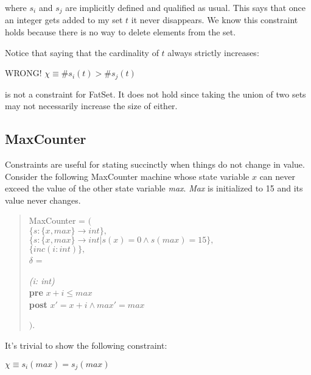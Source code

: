 \noindent where $s_i$ and $s_j$ are implicitly defined and qualified
as usual.  This says that once an integer gets added to my set $t$ it never
disappears.  We know this constraint holds because there is no way
to delete elements from the set.

Notice that saying that the cardinality of $t$ always
strictly increases:

\begin{center}
WRONG! $\chi \equiv \#s_i(t) > \#s_j(t)$
\end{center}

\noindent is not a constraint for FatSet.
It does not hold since taking the union of two sets
may not necessarily increase the size of either.

\subsection{MaxCounter}

Constraints are useful for stating succinctly when things
do not change in value.
Consider the following MaxCounter machine whose state variable $x$
can never exceed the value of the other state variable {\em max}.
{\em Max} is initialized to 15 and
its value never changes.

\begin{verse}
MaxCounter = $($ \\
$\{ s: \{x, max\} \rightarrow int  \},$ \\
$\{ s: \{x, max\} \rightarrow int | s(x) = 0 \wedge s(max) = 15 \},$ \\
$\{ inc(i: int) \},$ \\
$\delta$ = \\

\begin{spec}
\begin{tabbing}
\={\em (i: int)}\\
           \> {\bf pre} $ x + i \leq max$\\
           \> {\bf post} $x' = x + i \wedge max' = max$
\end{tabbing}
\end{spec}

$)$.
\end{verse}

It's trivial to show the following constraint:

\begin{center}
$\chi \equiv s_i(max) = s_j(max)$
\end{center}

